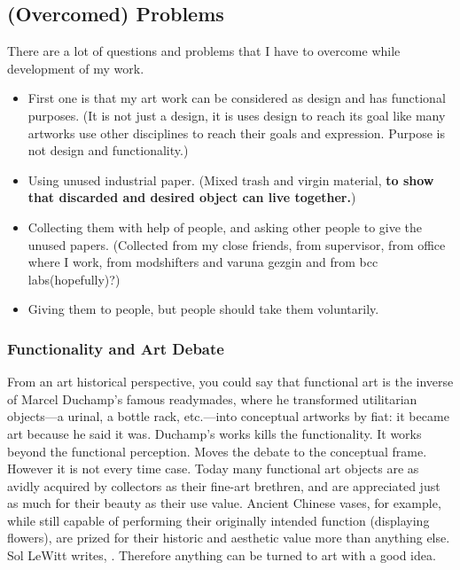 \subsection{(Overcomed) Problems}
There are a lot of questions and problems that I have to overcome while development of my work. 
\begin{itemize}
\item First one is that my art work can be considered as design and has functional purposes. (It is not just a design, it is uses design to reach its goal like many artworks use other disciplines to reach their goals and expression. Purpose is not design and functionality.)
\item Using unused industrial paper. (Mixed trash and virgin material, \textbf{to show that discarded and desired object can live together.})
\item Collecting them with help of people, and asking other people to give the unused papers. (Collected from my close friends, from supervisor, from office where I work, from modshifters and varuna gezgin and from bcc labs(hopefully)?)
\item Giving them to people, but people should take them voluntarily.
\end{itemize}

%
\subsubsection{Functionality and Art Debate}
From an art historical perspective, you could say that functional art is the inverse of Marcel Duchamp's famous readymades, where he transformed utilitarian objects---a urinal, a bottle rack, etc.---into conceptual artworks by fiat: it became art because he said it was. Duchamp's works kills the functionality. It works beyond the functional perception. Moves the debate to the conceptual frame. However it is not every time case. Today many functional art objects are as avidly acquired by collectors as their fine-art brethren, and are appreciated just as much for their beauty as their use value. Ancient Chinese vases, for example, while still capable of performing their originally intended function (displaying flowers), are prized for their historic and aesthetic value more than anything else.  Sol LeWitt writes,  \cite{lewitt1967paragraphs}. Therefore anything can be turned to art with a good idea. 

